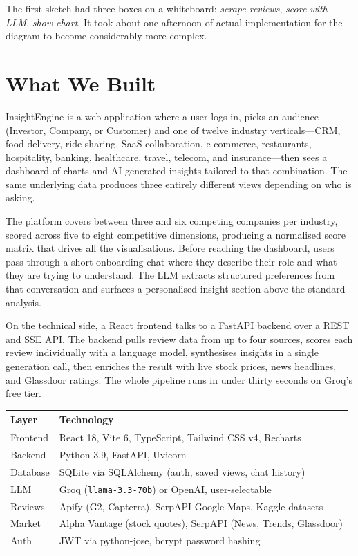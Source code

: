 \documentclass[9pt, a4paper, twocolumn]{article}
\begin{document}
The first sketch had three boxes on a whiteboard: \textit{scrape reviews}, \textit{score with LLM}, \textit{show chart}. It took about one afternoon of actual implementation for the diagram to become considerably more complex.

\section{What We Built}

InsightEngine is a web application where a user logs in, picks an audience (Investor, Company, or Customer) and one of twelve industry verticals---CRM, food delivery, ride-sharing, SaaS collaboration, e-commerce, restaurants, hospitality, banking, healthcare, travel, telecom, and insurance---then sees a dashboard of charts and AI-generated insights tailored to that combination. The same underlying data produces three entirely different views depending on who is asking.

The platform covers between three and six competing companies per industry, scored across five to eight competitive dimensions, producing a normalised score matrix that drives all the visualisations. Before reaching the dashboard, users pass through a short onboarding chat where they describe their role and what they are trying to understand. The LLM extracts structured preferences from that conversation and surfaces a personalised insight section above the standard analysis.

On the technical side, a React frontend talks to a FastAPI backend over a REST and SSE API. The backend pulls review data from up to four sources, scores each review individually with a language model, synthesises insights in a single generation call, then enriches the result with live stock prices, news headlines, and Glassdoor ratings. The whole pipeline runs in under thirty seconds on Groq's free tier.

\vspace{3pt}
{\fontsize{7.5pt}{9.5pt}\selectfont
\begin{tabularx}{\linewidth}{@{}l X@{}}
\toprule
\textbf{Layer} & \textbf{Technology} \\
\midrule
Frontend  & React 18, Vite 6, TypeScript, Tailwind CSS v4, Recharts \\
Backend   & Python 3.9, FastAPI, Uvicorn \\
Database  & SQLite via SQLAlchemy (auth, saved views, chat history) \\
LLM       & Groq (\texttt{llama-3.3-70b}) or OpenAI, user-selectable \\
Reviews   & Apify (G2, Capterra), SerpAPI Google Maps, Kaggle datasets \\
Market    & Alpha Vantage (stock quotes), SerpAPI (News, Trends, Glassdoor) \\
Auth      & JWT via python-jose, bcrypt password hashing \\
\bottomrule
\end{tabularx}
}
\vspace{3pt}
\end{document}
